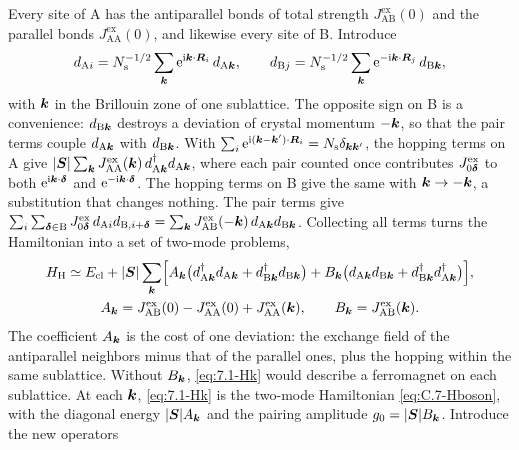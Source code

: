 Every site of A has the antiparallel bonds of total strength $J^{\mathrm{ex}}_{\mathrm{AB}}(0)$ and the parallel bonds $J^{\mathrm{ex}}_{\mathrm{AA}}(0)$, and likewise every site of B. Introduce
\begin{equation*}
  d_{\mathrm{A}i} = N_{\mathrm{s}}^{-1/2}\sum_{\bm{k}}\mathrm{e}^{\mathrm{i}\bm{k}\cdot\bm{R}_i}\,d_{\mathrm{A}\bm{k}}, \qquad
  d_{\mathrm{B}j} = N_{\mathrm{s}}^{-1/2}\sum_{\bm{k}}\mathrm{e}^{-\mathrm{i}\bm{k}\cdot\bm{R}_j}\,d_{\mathrm{B}\bm{k}} ,
\end{equation*}
with $\bm{k}$ in the Brillouin zone of one sublattice. The opposite sign on B is a convenience: $d_{\mathrm{B}\bm{k}}$ destroys a deviation of crystal momentum $-\bm{k}$, so that the pair terms couple $d_{\mathrm{A}\bm{k}}$ with $d_{\mathrm{B}\bm{k}}$. With $\sum_i\mathrm{e}^{\mathrm{i}(\bm{k}-\bm{k}')\cdot\bm{R}_i} = N_{\mathrm{s}}\delta_{\bm{k}\bm{k}'}$, the hopping terms on A give $|\bm{S}|\sum_{\bm{k}}J^{\mathrm{ex}}_{\mathrm{AA}}(\bm{k})\,d^\dagger_{\mathrm{A}\bm{k}}d_{\mathrm{A}\bm{k}}$, where each pair counted once contributes $J^{\mathrm{ex}}_{0\bm{\delta}}$ to both $\mathrm{e}^{\mathrm{i}\bm{k}\cdot\bm{\delta}}$ and $\mathrm{e}^{-\mathrm{i}\bm{k}\cdot\bm{\delta}}$. The hopping terms on B give the same with $\bm{k} \to -\bm{k}$, a substitution that changes nothing. The pair terms give $\sum_i\sum_{\bm{\delta}\in\mathrm{B}}J^{\mathrm{ex}}_{0\bm{\delta}}\,d_{\mathrm{A}i}d_{\mathrm{B},i+\bm{\delta}} = \sum_{\bm{k}}J^{\mathrm{ex}}_{\mathrm{AB}}(-\bm{k})\,d_{\mathrm{A}\bm{k}}d_{\mathrm{B}\bm{k}}$. Collecting all terms turns the Hamiltonian into a set of two-mode problems,
\begin{equation}
  \begin{gathered}
  H_{\mathrm{H}} \simeq E_{\mathrm{cl}} + |\bm{S}|\sum_{\bm{k}}\Bigl[A_{\bm{k}}\bigl(d^\dagger_{\mathrm{A}\bm{k}}d_{\mathrm{A}\bm{k}} + d^\dagger_{\mathrm{B}\bm{k}}d_{\mathrm{B}\bm{k}}\bigr) + B_{\bm{k}}\bigl(d_{\mathrm{A}\bm{k}}d_{\mathrm{B}\bm{k}} + d^\dagger_{\mathrm{B}\bm{k}}d^\dagger_{\mathrm{A}\bm{k}}\bigr)\Bigr] , \\
  A_{\bm{k}} = J^{\mathrm{ex}}_{\mathrm{AB}}(0) - J^{\mathrm{ex}}_{\mathrm{AA}}(0) + J^{\mathrm{ex}}_{\mathrm{AA}}(\bm{k}), \qquad B_{\bm{k}} = J^{\mathrm{ex}}_{\mathrm{AB}}(\bm{k}) .
  \end{gathered}
  \label{eq:7.1-Hk}
\end{equation}
The coefficient $A_{\bm{k}}$ is the cost of one deviation: the exchange field of the antiparallel neighbors minus that of the parallel ones, plus the hopping within the same sublattice. Without $B_{\bm{k}}$, \cref{eq:7.1-Hk} would describe a ferromagnet on each sublattice. At each $\bm{k}$, \cref{eq:7.1-Hk} is the two-mode Hamiltonian \cref{eq:C.7-Hboson}, with the diagonal energy $|\bm{S}|A_{\bm{k}}$ and the pairing amplitude $g_0 = |\bm{S}|B_{\bm{k}}$. Introduce the new operators
